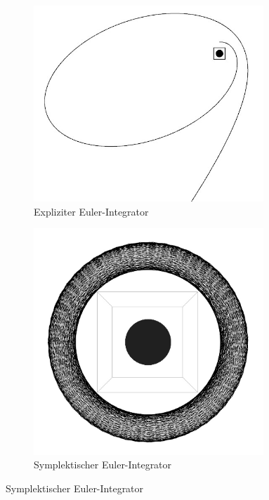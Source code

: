     \begin{figure}[p]
      \begin{subfigure}[b]{0.49\textwidth}
        \center
        \includegraphics[width=0.95\textwidth]{pictures/sun_earth/euler_0_05.jpg}
        \caption{Expliziter Euler-Integrator}
      \end{subfigure}
      \begin{subfigure}[b]{0.49\textwidth}
        \center
        \includegraphics[width=0.95\textwidth]{pictures/sun_earth/seuler_0_05.jpg}
        \caption{Symplektischer Euler-Integrator}
      \end{subfigure}


\end{figure}
